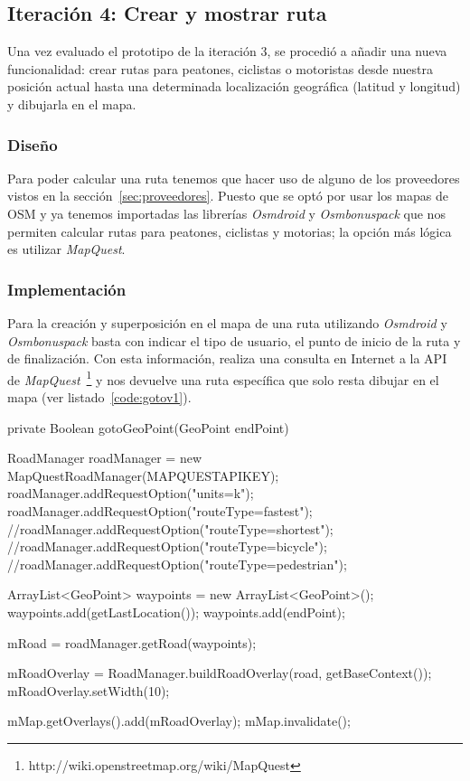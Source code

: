 \subsection{Iteración 4: Crear y mostrar ruta}

Una vez evaluado el prototipo de la iteración 3, se procedió a añadir una nueva funcionalidad: crear
rutas para peatones, ciclistas o motoristas desde nuestra posición actual hasta una determinada
localización geográfica (latitud y longitud) y dibujarla en el mapa.

\subsubsection{Diseño}

Para poder calcular una ruta tenemos que hacer uso de alguno de los proveedores vistos en la
sección~\ref{sec:proveedores}. Puesto que se optó por usar los mapas de \acs{OSM} y ya tenemos
importadas las librerías \emph{Osmdroid} y \emph{Osmbonuspack} que nos permiten calcular rutas para
peatones, ciclistas y motorias; la opción más lógica es utilizar \emph{MapQuest}.

\subsubsection{Implementación}

Para la creación y superposición en el mapa de una ruta utilizando \emph{Osmdroid} y
\emph{Osmbonuspack} basta con indicar el tipo de usuario, el punto de inicio de la ruta y de
finalización. Con esta información, realiza una consulta en Internet a la \acs{API} de
\emph{MapQuest}~\footnote{http://wiki.openstreetmap.org/wiki/MapQuest} y nos devuelve una ruta
específica que solo resta dibujar en el mapa (ver listado~\ref{code:gotov1}).

\begin{listing}[
  float=ht,
  language = java,
  caption  = {Ejemplo de creación y superposición de una ruta en el mapa},
  label    = code:gotov1]
private Boolean gotoGeoPoint(GeoPoint endPoint) {
    RoadManager roadManager = new MapQuestRoadManager(MAPQUESTAPIKEY);
    roadManager.addRequestOption("units=k");
    roadManager.addRequestOption("routeType=fastest");
    //roadManager.addRequestOption("routeType=shortest");
    //roadManager.addRequestOption("routeType=bicycle");
    //roadManager.addRequestOption("routeType=pedestrian");
    
    ArrayList<GeoPoint> waypoints = new ArrayList<GeoPoint>();
    waypoints.add(getLastLocation());
    waypoints.add(endPoint);
    
    mRoad = roadManager.getRoad(waypoints);
            
    mRoadOverlay = RoadManager.buildRoadOverlay(road, getBaseContext());
    mRoadOverlay.setWidth(10);

    mMap.getOverlays().add(mRoadOverlay);            
    mMap.invalidate();
}
\end{listing}

